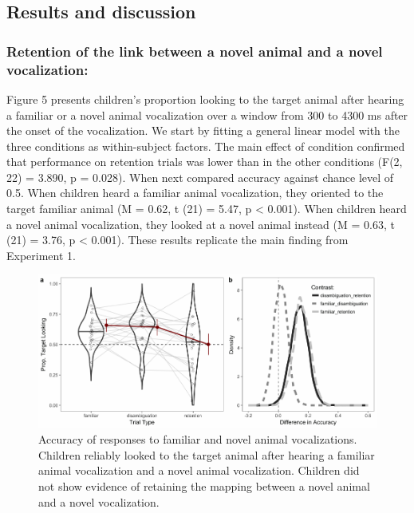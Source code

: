\documentclass[english,floatsintext,man]{apa6}
\theoremstyle{definition}
\theoremstyle{definition}
\theoremstyle{definition}
\theoremstyle{remark}
\begin{document}
\subsection{Results and discussion}\label{results-and-discussion-1}

\subsubsection{Retention of the link between a novel animal and a novel
vocalization:}\label{retention-of-the-link-between-a-novel-animal-and-a-novel-vocalization}

Figure 5 presents children's proportion looking to the target animal
after hearing a familiar or a novel animal vocalization over a window
from 300 to 4300 ms after the onset of the vocalization. We start by
fitting a general linear model with the three conditions as
within-subject factors. The main effect of condition confirmed that
performance on retention trials was lower than in the other conditions
(F(2, 22) = 3.890, p = 0.028). When next compared accuracy against
chance level of 0.5. When children heard a familiar animal vocalization,
they oriented to the target familiar animal (M = 0.62, t (21) = 5.47, p
\textless{} 0.001). When children heard a novel animal vocalization,
they looked at a novel animal instead (M = 0.63, t (21) = 3.76, p
\textless{} 0.001). These results replicate the main finding from
Experiment 1.

\begin{figure}
\centering
\includegraphics{anime_manuscript_files/figure-latex/acc-plot-e2-1.pdf}
\caption{\label{fig:acc-plot-e2}Accuracy of responses to familiar and novel
animal vocalizations. Children reliably looked to the target animal
after hearing a familiar animal vocalization and a novel animal
vocalization. Children did not show evidence of retaining the mapping
between a novel animal and a novel vocalization.}
\end{figure}
\end{document}
